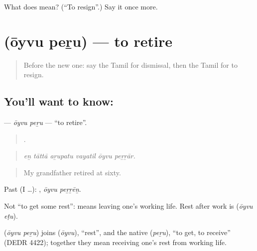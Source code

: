 \begin{tcolorbox}[breakable,colback=teal!4,colframe=teal!35!black,title={Before you move on}]
What does   mean? (\textquotedblleft{}To resign\textquotedblright{}.) Say it once more.
\end{tcolorbox}
\section[\texorpdfstring{\ta{ஓய்வு} \ta{பெறு} (ōyvu peṟu)}{ஓய்வு பெறு (ōyvu peṟu)}]{  (ōyvu peṟu) — to retire}

\label{lesson:TA-C512-oyvu-peru}



\begin{quote}
Before the new one: say the Tamil for dismissal, then the Tamil for to resign.
\end{quote}

\subsection*{You'll want to know:  }
\textbf{ } — \emph{ōyvu peṟu} — \textquotedblleft{}to retire\textquotedblright{}.

\begin{quote}
     .
\end{quote}

\begin{quote}
\emph{eṉ tāttā aṟupatu vayatil ōyvu peṟṟār.}
\end{quote}

\begin{quote}
My grandfather retired at sixty.
\end{quote}

Past (I …):  , \emph{ōyvu peṟṟēṉ}.

Not \textquotedblleft{}to get some rest\textquotedblright{}:   means leaving one's working life. Rest after work is   (\emph{ōyvu eṭu}).

\begin{cousinweb}
\textbf{ } (\emph{ōyvu peṟu}) joins  (\emph{ōyvu}), \textquotedblleft{}rest\textquotedblright{}, and the native  (\emph{peṟu}), \textquotedblleft{}to get, to receive\textquotedblright{} (DEDR 4422); together they mean receiving one's rest from working life.
\end{cousinweb}

